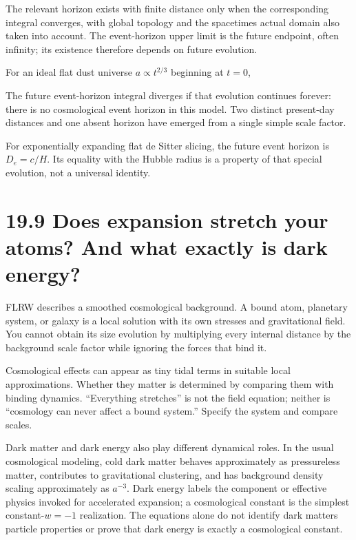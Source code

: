 \documentclass[
  11pt,
  letterpaper,
  oneside,
  openany]{scrbook}
\begin{document}
\endgroup

The relevant horizon exists with finite distance only when the
corresponding integral converges, with global topology and the
spacetime\textquotesingle s actual domain also taken into account. The
event-horizon upper limit is the future endpoint, often infinity; its
existence therefore depends on future evolution.

For an ideal flat dust universe \(a\propto t^{2/3}\) beginning at
\(t=0\),

\begin{center}
\begingroup
{}
\ifdim\wd\grmathbox>\linewidth
\resizebox{\linewidth}{!}{\usebox{\grmathbox}}
\else\usebox{\grmathbox}\fi
\endgroup
\end{center}

The future event-horizon integral diverges if that evolution continues
forever: there is no cosmological event horizon in this model. Two
distinct present-day distances and one absent horizon have emerged from
a single simple scale factor.

For exponentially expanding flat de Sitter slicing, the future event
horizon is \(D_e=c/H\). Its equality with the Hubble radius is a
property of that special evolution, not a universal identity.

\hypertarget{does-expansion-stretch-your-atoms-and-what-exactly-is-dark-energy}{%
\section{19.9 Does expansion stretch your atoms? And what exactly is
dark
energy?}\label{does-expansion-stretch-your-atoms-and-what-exactly-is-dark-energy}}

FLRW describes a smoothed cosmological background. A bound atom,
planetary system, or galaxy is a local solution with its own stresses
and gravitational field. You cannot obtain its size evolution by
multiplying every internal distance by the background scale factor while
ignoring the forces that bind it.

Cosmological effects can appear as tiny tidal terms in suitable local
approximations. Whether they matter is determined by comparing them with
binding dynamics. ``Everything stretches'' is not the field equation;
neither is ``cosmology can never affect a bound system.'' Specify the
system and compare scales.

Dark matter and dark energy also play different dynamical roles. In the
usual cosmological modeling, cold dark matter behaves approximately as
pressureless matter, contributes to gravitational clustering, and has
background density scaling approximately as \(a^{-3}\). Dark energy
labels the component or effective physics invoked for accelerated
expansion; a cosmological constant is the simplest constant-\(w=-1\)
realization. The equations alone do not identify dark
matter\textquotesingle s particle properties or prove that dark energy
is exactly a cosmological constant.
\end{document}

